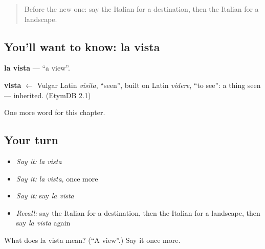 \label{lesson:IT-C171-vista}



\begin{quote}
Before the new one: say the Italian for a destination, then the Italian for a landscape.
\end{quote}

\subsection*{You'll want to know: la vista}
\textbf{la vista} — \textquotedblleft{}a view\textquotedblright{}.

\begin{cousinweb}
\textbf{vista} $\leftarrow$ Vulgar Latin \emph{visita}, \textquotedblleft{}seen\textquotedblright{}, built on Latin \emph{videre}, \textquotedblleft{}to see\textquotedblright{}: a thing seen — inherited. (EtymDB 2.1)
\end{cousinweb}

\begin{grammarlens}[title={What you've built}]
One more word for this chapter.
\end{grammarlens}

\subsection*{Your turn}
\begin{itemize}
\raggedright
  \item \emph{Say it:} \emph{la vista}
  \item \emph{Say it:} \emph{la vista}, once more
  \item \emph{Say it:} say \emph{la vista}
  \item \emph{Recall:} say the Italian for a destination, then the Italian for a landscape, then say \emph{la vista} again
\end{itemize}

\begin{tcolorbox}[breakable,colback=teal!4,colframe=teal!35!black,title={Before you move on}]
What does la vista mean? (\textquotedblleft{}A view\textquotedblright{}.) Say it once more.
\end{tcolorbox}
